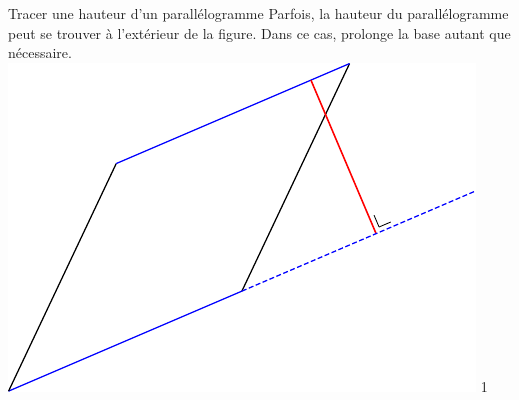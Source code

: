\documentclass[a4paper,11pt]{report}
\let\oldcenter\center
\let\oldendcenter\endcenter
\renewenvironment{center}{\setlength\topsep{-10pt}\oldcenter}{\oldendcenter}
\begin{document}
\begin{resolu}{Tracer une hauteur d'un parallélogramme}
{Parfois, la hauteur du parallélogramme peut se trouver à l'extérieur de la figure. Dans ce cas, prolonge la base autant que nécessaire.
\begin{center} \includegraphics[]{media/gm-01/parallelogramme5}
    \end{center}
}{1}
\end{resolu}
\end{document}
